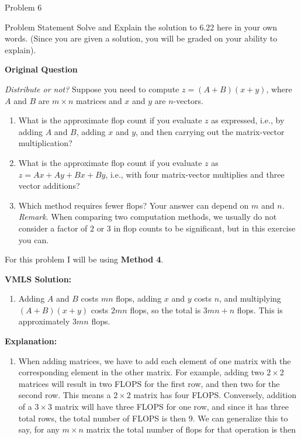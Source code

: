\begin{problem}{Problem 6}
    \begin{statement}{Problem Statement}
        Solve and Explain the solution to 6.22 here in your own words. (Since you are given a solution, you will be graded on your ability to explain). \vspace*{1em}

        \noindent \textbf{Original Question} \vspace*{1em}

        \textit{Distribute or not?} Suppose you need to compute $z = (A+ B)(x+ y)$, where $A$ and $B$ are $m \times n$ matrices and $x$ and $y$ are $n$-vectors.

        \begin{enumerate}[label = (\alph*)]
            \item What is the approximate flop count if you evaluate $z$ as expressed, i.e., by adding $A$ and $B$, adding $x$ and $y$, and then carrying out the matrix-vector multiplication?
            \item What is the approximate flop count if you evaluate $z$ as $z = Ax + Ay + Bx + By$, i.e., with four matrix-vector multiplies and three vector additions?
            \item Which method requires fewer flops? Your answer can depend on $m$ and $n$. \textit{Remark}. When comparing two computation methods, we usually do not consider a factor of 2 or 3 in 
            flop counts to be significant, but in this exercise you can.
        \end{enumerate}
    \end{statement}

    \begin{Highlight}
        For this problem I will be using \textbf{Method 4}. \vspace*{1em}

        \noindent \textbf{VMLS Solution:}

        \begin{enumerate}[label = (\alph*)]
            \item Adding $A$ and $B$ costs $mn$ flops, adding $x$ and $y$ costs $n$, and multiplying $(A + B)(x + y)$ costs $2mn$ flops, so the total is $3mn + n$ flops. This is approximately $3mn$ flops.
        \end{enumerate}

        \noindent \textbf{Explanation:}

        \begin{enumerate}[label = (\alph*)]
            \item When adding matrices, we have to add each element of one matrix with the corresponding element in the other matrix. For example, adding two $2 \times 2$ matrices will result in two FLOPS for
            the first row, and then two for the second row. This means a $2 \times 2$ matrix has four FLOPS. Conversely, addition of a $3 \times 3$ matrix will have three FLOPS for one row, and since it
            has three total rows, the total number of FLOPS is then 9. We can generalize this to say, for any $m \times n$ matrix the total number of flops for that operation is then
    

\end{enumerate}
\end{Highlight}
\end{problem}
